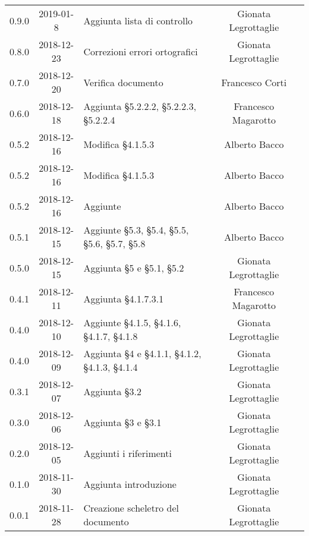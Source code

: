 {\begin{longtable}{ c c C{4cm} c c }
		0.9.0 & 2019-01-8 & Aggiunta lista di controllo & Gionata Legrottaglie & \reda{} \\
		
		0.8.0 & 2018-12-23 & Correzioni errori ortografici & Gionata Legrottaglie & \reda{} \\
		
		0.7.0 & 2018-12-20 & Verifica documento & Francesco Corti & \ver{}\\
		
		0.6.0 & 2018-12-18 & Aggiunta §5.2.2.2, §5.2.2.3, §5.2.2.4 & Francesco Magarotto & \reda{} \\
		
		0.5.2 & 2018-12-16 & Modifica §4.1.5.3 & Alberto Bacco & \reda{} \\
		
		0.5.2 & 2018-12-16 & Modifica §4.1.5.3 & Alberto Bacco & \reda{} \\
		
		0.5.2 & 2018-12-16 & Aggiunte  & Alberto Bacco & \reda{} \\
		
		0.5.1 & 2018-12-15 & Aggiunte §5.3, §5.4, §5.5, §5.6, §5.7, §5.8 & Alberto Bacco & \reda{} \\
		
		0.5.0 & 2018-12-15 & Aggiunta §5 e §5.1, §5.2 & Gionata Legrottaglie & \reda{} \\
		
		0.4.1 & 2018-12-11 & Aggiunta §4.1.7.3.1 & Francesco Magarotto & \reda{} \\ 
		
		0.4.0 & 2018-12-10 & Aggiunte §4.1.5, §4.1.6, §4.1.7, §4.1.8 & Gionata Legrottaglie & \reda{} \\ 
		0.4.0 & 2018-12-09 & Aggiunta §4 e §4.1.1, §4.1.2, §4.1.3, §4.1.4 & Gionata Legrottaglie & \reda{} \\ 
		
		0.3.1 & 2018-12-07 & Aggiunta §3.2 & Gionata Legrottaglie & \reda{} \\ 
		
		0.3.0 & 2018-12-06 & Aggiunta §3 e §3.1 & Gionata Legrottaglie & \reda{} \\ 
		
		0.2.0 & 2018-12-05 & Aggiunti i riferimenti & Gionata Legrottaglie & \reda{} \\ 
		
		0.1.0 & 2018-11-30 & Aggiunta introduzione & Gionata Legrottaglie & \reda{} \\
		
		0.0.1 & 2018-11-28 & Creazione scheletro del documento & Gionata Legrottaglie & \reda{}\\
		
	\end{longtable}

}